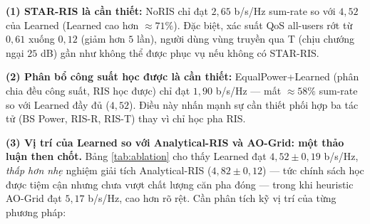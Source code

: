 \textbf{(1) STAR-RIS là cần thiết:} NoRIS chỉ đạt $2{,}65$ b/s/Hz
sum-rate so với $4{,}52$ của Learned (Learned cao hơn $\approx 71\%$).
Đặc biệt, xác suất QoS all-users rớt từ $0{,}61$ xuống $0{,}12$ (giảm
hơn $5$ lần), người dùng vùng truyền qua T (chịu chướng ngại $25$ dB)
gần như không thể được phục vụ nếu không có STAR-RIS.

\textbf{(2) Phân bổ công suất học được là cần thiết:}
EqualPower+Learned (phân chia đều công suất, RIS học được) chỉ
đạt $1{,}90$ b/s/Hz --- mất $\approx 58\%$ sum-rate so với Learned đầy
đủ ($4{,}52$). Điều này nhấn mạnh sự cần thiết phối hợp ba tác tử (BS
Power, RIS-R, RIS-T) thay vì chỉ học pha RIS.

\textbf{(3) Vị trí của Learned so với Analytical-RIS và AO-Grid: một
thảo luận then chốt.} Bảng \ref{tab:ablation} cho thấy Learned đạt
$4{,}52 \pm 0{,}19$ b/s/Hz, \emph{thấp hơn nhẹ} nghiệm giải tích
Analytical-RIS ($4{,}82 \pm 0{,}12$) --- tức chính sách học được tiệm
cận nhưng chưa vượt chất lượng căn pha đóng --- trong khi heuristic
AO-Grid đạt $5{,}17$ b/s/Hz, cao hơn rõ
rệt. Cần phân tích kỹ vị trí của từng phương pháp:
